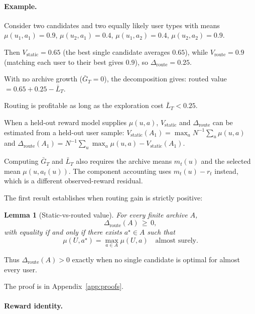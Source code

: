 \documentclass{article} %
\newtheorem{lemma}[theorem]{Lemma}
\begin{document}
\paragraph{Example.} Consider two candidates and two equally likely user types with means $\mu(u_1,a_1)=0.9$, $\mu(u_2,a_1)=0.4$, $\mu(u_1,a_2)=0.4$, $\mu(u_2,a_2)=0.9$.

Then $V_{\mathrm{static}}=0.65$ (the best single candidate averages $0.65$), while $V_{\mathrm{route}}=0.9$ (matching each user to their best gives $0.9$), so $\Delta_{\mathrm{route}}=0.25$.

With no archive growth ($\bar G_T=0$), the decomposition gives: routed value $= 0.65 + 0.25 - \bar L_T$.

Routing is profitable as long as the exploration cost $\bar L_T < 0.25$.

When a held-out reward model supplies \(\mu(u,a)\),
\(V_{\mathrm{static}}\) and \(\Delta_{\mathrm{route}}\) can be estimated from a
held-out user sample:
\(V_{\mathrm{static}}(A_1)=\max_a N^{-1}\sum_u\mu(u,a)\) and
\(\Delta_{\mathrm{route}}(A_1)
=N^{-1}\sum_u\max_a\mu(u,a)-V_{\mathrm{static}}(A_1)\).

Computing \(\bar G_T\) and \(\bar L_T\) also requires the archive means
\(m_t(u)\) and the selected mean \(\mu(u,a_t(u))\). The component accounting uses
\(m_t(u)-r_t\) instead, which is a different observed-reward residual.

\label{sec:method-lem-het}

The first result establishes when routing gain is strictly positive:

\begin{lemma}[Static-vs-routed value]
\label{lem:hetero}
For every finite archive $A$,
\begin{equation}
\label{eq:lem-hetero}
\Delta_{\mathrm{route}}(A) \,\ge\, 0,
\end{equation}
with equality if and only if there exists $a^\star \in A$ such that
\begin{equation}
\label{eq:lem-hetero-eq}
\mu(U, a^\star) = \max_{a \in A} \mu(U,a) \quad \text{almost surely.}
\end{equation}
\end{lemma}

Thus \(\Delta_{\mathrm{route}}(A)>0\) exactly when no single candidate is
optimal for almost every user.

The proof is in Appendix~\ref{app:proofs}.

\paragraph{Reward identity.}
\end{document}
